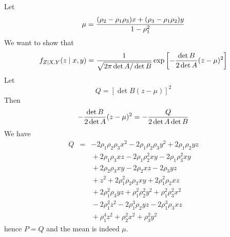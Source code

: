 Let
$$\mu={(\rho_2-\rho_1\rho_3)x+(\rho_3-\rho_1\rho_2)y\over
1-\rho_1^2}$$
We want to show that
$$f_{Z\mid X,Y}(z\mid x,y)=
{1\over\sqrt{2\pi\det A/\det B}}\exp\left[
-{\det B\over2\det A}(z-\mu)^2\right]$$
Let
$$Q=[\det B(z-\mu)]^2$$
Then
$$-{\det B\over2\det A}(z-\mu)^2=-{Q\over2\det A\det B}$$
We have
\begin{eqnarray*}
Q&=&-2\rho_1\rho_2\rho_3x^2-2\rho_1\rho_2\rho_3y^2+2\rho_1\rho_2yz\\
& & {}+2\rho_1\rho_3xz-2\rho_1\rho_2^2xy-2\rho_1\rho_3^2xy\\
& & {}+2\rho_2\rho_3xy-2\rho_2xz-2\rho_3yz\\
& & {}+z^2+2\rho_1^2\rho_2\rho_3xy+2\rho_1^2\rho_2xz\\
& & {}+2\rho_1^2\rho_3yz+\rho_1^2\rho_2^2y^2+\rho_1^2\rho_3^2x^2\\
& & {}-2\rho_1^2z^2-2\rho_1^3\rho_2yz-2\rho_1^3\rho_3xz\\
& & {}+\rho_1^4z^2+\rho_2^2x^2+\rho_3^2y^2
\end{eqnarray*}
hence $P=Q$ and the mean is indeed $\mu$.
